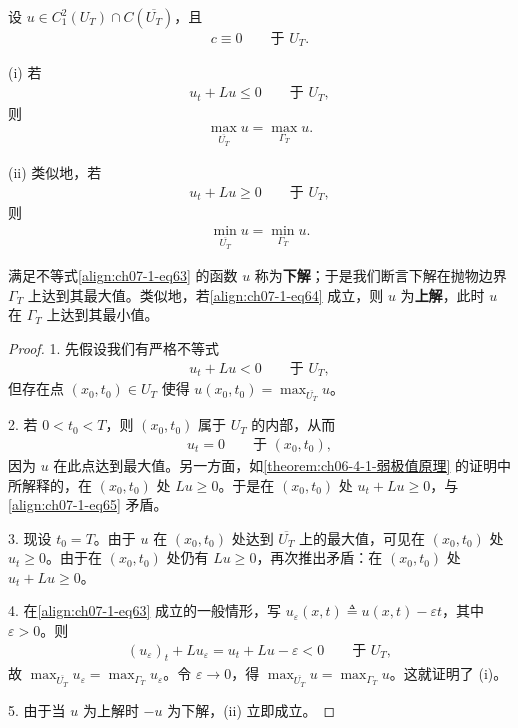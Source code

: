 \documentclass[../../main.tex]{subfiles}
\begin{document}
\begin{theorem}[弱极值原理。]\label{theorem:ch06-4-1-弱极值原理}设 $u\in C^2_1(U_T)\cap C(\overline{U_T})$，且
\begin{align}
c\equiv 0\qquad \text{于 } U_T.\label{align:ch07-1-eq62}
\end{align}

(i) 若
\begin{align}
u_t+Lu\leqslant 0\qquad \text{于 } U_T,\label{align:ch07-1-eq63}
\end{align}
则
\begin{align*}
\max_{\overline{U_T}} u = \max_{\Gamma_T} u.
\end{align*}

(ii) 类似地，若
\begin{align}
u_t+Lu\geqslant 0\qquad \text{于 } U_T,\label{align:ch07-1-eq64}
\end{align}
则
\begin{align*}
\min_{\overline{U_T}} u = \min_{\Gamma_T} u.
\end{align*}
\end{theorem}

满足不等式\eqref{align:ch07-1-eq63} 的函数 $u$ 称为\textbf{下解}；于是我们断言下解在抛物边界 $\Gamma_T$ 上达到其最大值。类似地，若\eqref{align:ch07-1-eq64} 成立，则 $u$ 为\textbf{上解}，此时 $u$ 在 $\Gamma_T$ 上达到其最小值。

\begin{proof}
1. 先假设我们有严格不等式
\begin{align}
u_t+Lu<0\qquad \text{于 } U_T,\label{align:ch07-1-eq65}
\end{align}
但存在点 $(x_0,t_0)\in U_T$ 使得 $u(x_0,t_0)=\max_{\overline{U_T}}u$。

2. 若 $0<t_0<T$，则 $(x_0,t_0)$ 属于 $U_T$ 的内部，从而
\begin{align}
u_t=0\qquad \text{于 }(x_0,t_0),\label{align:ch07-1-eq66}
\end{align}
因为 $u$ 在此点达到最大值。另一方面，如\cref{theorem:ch06-4-1-弱极值原理} 的证明中所解释的，在 $(x_0,t_0)$ 处 $Lu\geqslant 0$。于是在 $(x_0,t_0)$ 处 $u_t+Lu\geqslant 0$，与\eqref{align:ch07-1-eq65} 矛盾。

3. 现设 $t_0=T$。由于 $u$ 在 $(x_0,t_0)$ 处达到 $\overline{U_T}$ 上的最大值，可见在 $(x_0,t_0)$ 处 $u_t\geqslant 0$。由于在 $(x_0,t_0)$ 处仍有 $Lu\geqslant 0$，再次推出矛盾：在 $(x_0,t_0)$ 处 $u_t+Lu\geqslant 0$。

4. 在\eqref{align:ch07-1-eq63} 成立的一般情形，写 $u_\varepsilon(x,t)\triangleq u(x,t)-\varepsilon t$，其中 $\varepsilon>0$。则
\begin{align*}
(u_\varepsilon)_t+Lu_\varepsilon = u_t+Lu-\varepsilon<0\qquad \text{于 } U_T,
\end{align*}
故 $\max_{\overline{U_T}}u_\varepsilon=\max_{\Gamma_T}u_\varepsilon$。令 $\varepsilon\to 0$，得 $\max_{\overline{U_T}}u=\max_{\Gamma_T}u$。这就证明了 (i)。

5. 由于当 $u$ 为上解时 $-u$ 为下解，(ii) 立即成立。
\end{proof}
\end{document}
